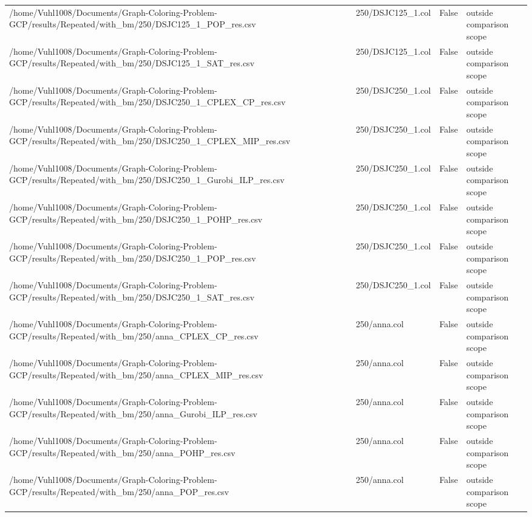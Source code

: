 \begin{table}[htbp]
\begin{tabular}{llll}
/home/Vuhl1008/Documents/Graph-Coloring-Problem-GCP/results/Repeated/with\_bm/250/DSJC125\_1\_POP\_res.csv & 250/DSJC125\_1.col & False & outside comparison scope \\
/home/Vuhl1008/Documents/Graph-Coloring-Problem-GCP/results/Repeated/with\_bm/250/DSJC125\_1\_SAT\_res.csv & 250/DSJC125\_1.col & False & outside comparison scope \\
/home/Vuhl1008/Documents/Graph-Coloring-Problem-GCP/results/Repeated/with\_bm/250/DSJC250\_1\_CPLEX\_CP\_res.csv & 250/DSJC250\_1.col & False & outside comparison scope \\
/home/Vuhl1008/Documents/Graph-Coloring-Problem-GCP/results/Repeated/with\_bm/250/DSJC250\_1\_CPLEX\_MIP\_res.csv & 250/DSJC250\_1.col & False & outside comparison scope \\
/home/Vuhl1008/Documents/Graph-Coloring-Problem-GCP/results/Repeated/with\_bm/250/DSJC250\_1\_Gurobi\_ILP\_res.csv & 250/DSJC250\_1.col & False & outside comparison scope \\
/home/Vuhl1008/Documents/Graph-Coloring-Problem-GCP/results/Repeated/with\_bm/250/DSJC250\_1\_POHP\_res.csv & 250/DSJC250\_1.col & False & outside comparison scope \\
/home/Vuhl1008/Documents/Graph-Coloring-Problem-GCP/results/Repeated/with\_bm/250/DSJC250\_1\_POP\_res.csv & 250/DSJC250\_1.col & False & outside comparison scope \\
/home/Vuhl1008/Documents/Graph-Coloring-Problem-GCP/results/Repeated/with\_bm/250/DSJC250\_1\_SAT\_res.csv & 250/DSJC250\_1.col & False & outside comparison scope \\
/home/Vuhl1008/Documents/Graph-Coloring-Problem-GCP/results/Repeated/with\_bm/250/anna\_CPLEX\_CP\_res.csv & 250/anna.col & False & outside comparison scope \\
/home/Vuhl1008/Documents/Graph-Coloring-Problem-GCP/results/Repeated/with\_bm/250/anna\_CPLEX\_MIP\_res.csv & 250/anna.col & False & outside comparison scope \\
/home/Vuhl1008/Documents/Graph-Coloring-Problem-GCP/results/Repeated/with\_bm/250/anna\_Gurobi\_ILP\_res.csv & 250/anna.col & False & outside comparison scope \\
/home/Vuhl1008/Documents/Graph-Coloring-Problem-GCP/results/Repeated/with\_bm/250/anna\_POHP\_res.csv & 250/anna.col & False & outside comparison scope \\
/home/Vuhl1008/Documents/Graph-Coloring-Problem-GCP/results/Repeated/with\_bm/250/anna\_POP\_res.csv & 250/anna.col & False & outside comparison scope \\

\end{tabular}
\end{table}
